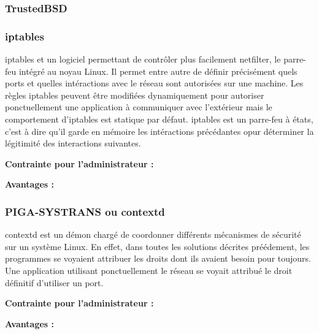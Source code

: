 \subsubsection{TrustedBSD}


\subsubsection{iptables}

iptables et un logiciel permettant de contrôler plus facilement netfilter, le parre-feu intégré au noyau Linux. Il permet entre autre de définir précisément quels ports et quelles intéractions avec le réseau sont autorisées sur une machine. Les règles iptables peuvent être modifiées dynamiquement pour autoriser ponctuellement une application à communiquer avec l'extérieur mais le comportement d'iptables est statique par défaut. iptables est un parre-feu à états, c'est à dire qu'il garde en mémoire les intéractions précédantes opur déterminer la légitimité des interactions suivantes.

\begin{list}{}{}
 \item \textbf{Contrainte pour l'administrateur :}
 \item \textbf{Avantages :}
\end{list}

\subsubsection{PIGA-SYSTRANS ou contextd}

contextd est un démon chargé de coordonner différents mécanismes de sécurité sur un système Linux. En effet, dans toutes les solutions décrites préédement, les programmes se voyaient attribuer les droits dont ils avaient besoin pour toujours. Une application utilisant ponctuellement le réseau se voyait attribué le droit définitif d'utiliser un port.

\begin{list}{}{}
 \item \textbf{Contrainte pour l'administrateur :}
 \item \textbf{Avantages :}
\end{list}

% 
% 
% 
